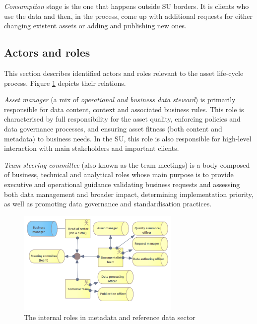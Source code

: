 	\textit{Consumption} stage is the one that happens outside SU borders. It is clients who use the data and then, in the process, come up with additional requests for either changing existent assets or adding and publishing new ones. 
	
	\subsection{Actors and roles}
	\label{sec:lifecycle-roles}	
	
	This section describes identified actors and roles relevant to the asset life-cycle process. Figure \ref{fig:internal-roles} depicts their relations.
		
	\textit{Asset manager} (a mix of \textit{operational and business data steward}) is primarily responsible for data content, context and associated business rules. This role is characterised by full responsibility for the asset quality, enforcing policies and data governance processes, and ensuring asset fitness (both content and metadata) to business needs. In the SU, this role is also responsible for high-level interaction with main stakeholders and important clients.
	
	\textit{Team steering committee} (also known as the team meetings) is a body composed of business, technical and analytical roles whose main purpose is to provide executive and operational guidance validating business requests and assessing both data management and broader impact, determining implementation priority, as well as promoting data governance and standardisation practices.
	
	
	\begin{figure}[h]
		\centering
		\includegraphics[width=0.7\textwidth]{images/business/Internal Roles.png}
		\caption{The internal roles in metadata and reference data sector}
		\label{fig:internal-roles}
	\end{figure}
	
